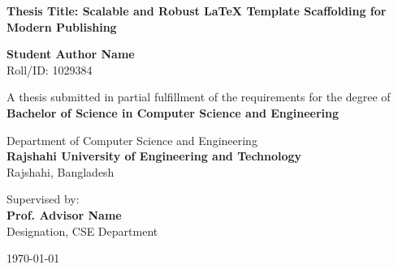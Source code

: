 \begin{titlepage}
\begin{center}
    \vspace*{1cm}
    
    
    \vspace{1.5cm}
    
    {\huge \bfseries \color{primary} Thesis Title: Scalable and Robust LaTeX Template Scaffolding for Modern Publishing}
    
    \vspace{1.5cm}
    
    {\Large \bfseries Student Author Name} \\
    \vspace{0.2cm}
    {Roll/ID: 1029384}
    
    \vspace{1.5cm}
    
    {A thesis submitted in partial fulfillment of the requirements for the degree of} \\
    \vspace{0.3cm}
    {\large \bfseries \color{secondary} Bachelor of Science in Computer Science and Engineering}
    
    \vspace{1.5cm}
    
    {\large Department of Computer Science and Engineering} \\
    \vspace{0.2cm}
    {\large \bfseries \color{primary} Rajshahi University of Engineering and Technology} \\
    \vspace{0.1cm}
    {Rajshahi, Bangladesh}
    
    \vfill
    
    {Supervised by:} \\
    {\large \bfseries Prof. Advisor Name} \\
    {Designation, CSE Department}
    
    \vspace{1cm}
    
    {\large \today}
    
\end{center}
\end{titlepage}
